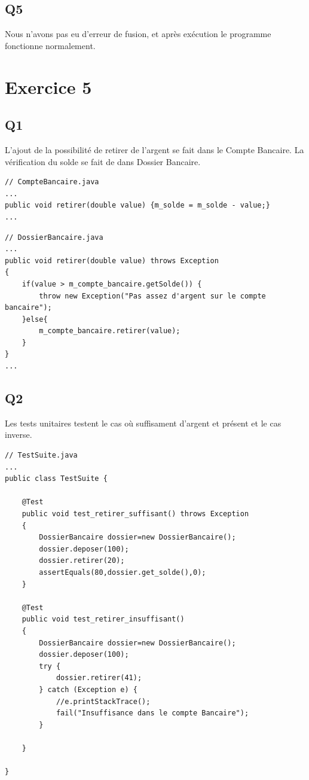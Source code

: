 \documentclass[12pt]{article}
\begin{document}
\subsection{Q5}
Nous n'avons pas eu d'erreur de fusion, et après exécution le programme fonctionne normalement.


\section{Exercice 5}

\subsection{Q1}

L'ajout de la possibilité de retirer de l'argent se fait dans le Compte Bancaire.
La vérification du solde se fait de dans Dossier Bancaire.

\begin{lstlisting}
// CompteBancaire.java
...
public void retirer(double value) {m_solde = m_solde - value;}
...
\end{lstlisting}

\begin{lstlisting}
// DossierBancaire.java
...
public void retirer(double value) throws Exception
{
    if(value > m_compte_bancaire.getSolde()) {
        throw new Exception("Pas assez d'argent sur le compte bancaire");
    }else{
        m_compte_bancaire.retirer(value);
    }
}
...
\end{lstlisting}

\subsection{Q2}

Les tests unitaires testent le cas où suffisament d'argent et présent et le cas inverse.

\begin{lstlisting}
// TestSuite.java
...
public class TestSuite {

	@Test  
	public void test_retirer_suffisant() throws Exception 
	{
		DossierBancaire dossier=new DossierBancaire();
		dossier.deposer(100);
		dossier.retirer(20);
		assertEquals(80,dossier.get_solde(),0); 
	}

	@Test
	public void test_retirer_insuffisant() 
	{
		DossierBancaire dossier=new DossierBancaire();
		dossier.deposer(100);
		try {
			dossier.retirer(41);
		} catch (Exception e) {
			//e.printStackTrace();
			fail("Insuffisance dans le compte Bancaire");
		}
		
	}

}
\end{lstlisting}
\end{document}
